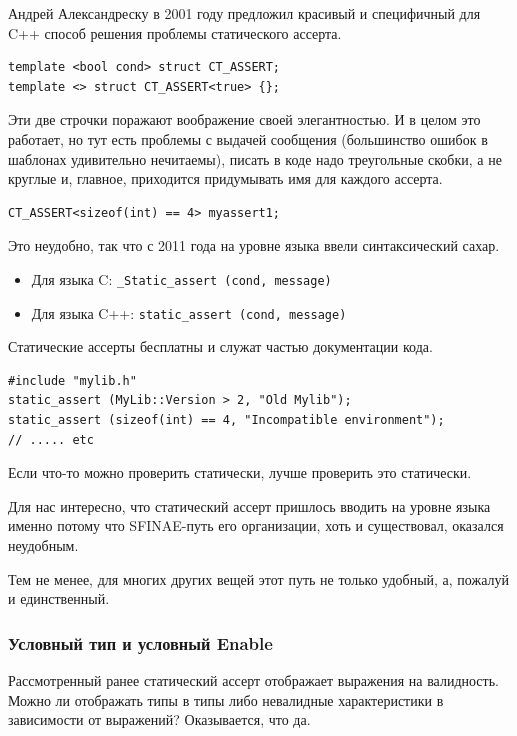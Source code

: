 \documentclass[a4paper,12pt,oneside]{article}
\begin{document}
Андрей Александреску \cite{mcpp} в 2001 году предложил красивый и специфичный для C++ способ решения проблемы статического ассерта.

\begin{lstlisting}
template <bool cond> struct CT_ASSERT;
template <> struct CT_ASSERT<true> {};
\end{lstlisting}

Эти две строчки поражают воображение своей элегантностью. И в целом это работает, но тут есть проблемы с выдачей сообщения (большинство ошибок в шаблонах удивительно нечитаемы), писать в коде надо треугольные скобки, а не круглые и, главное, приходится придумывать имя для каждого ассерта.

\begin{lstlisting}
CT_ASSERT<sizeof(int) == 4> myassert1; 
\end{lstlisting}

Это неудобно, так что с 2011 года на уровне языка ввели синтаксический сахар.

\begin{itemize}
\item Для языка C: \lstinline!_Static_assert (cond, message)!
\item Для языка C++: \lstinline!static_assert (cond, message)!
\end{itemize}

Статические ассерты бесплатны и служат частью документации кода.

\begin{lstlisting}
#include "mylib.h"
static_assert (MyLib::Version > 2, "Old Mylib");
static_assert (sizeof(int) == 4, "Incompatible environment");
// ..... etc
\end{lstlisting}

Если что-то можно проверить статически, лучше проверить это статически.

Для нас интересно, что статический ассерт пришлось вводить на уровне языка именно потому что SFINAE-путь его организации, хоть и существовал, оказался неудобным.

Тем не менее, для многих других вещей этот путь не только удобный, а, пожалуй и единственный.

\subsubsection{Условный тип и условный Enable}

Рассмотренный ранее статический ассерт отображает выражения на валидность. Можно ли отображать типы в типы либо невалидные характеристики в зависимости от выражений? Оказывается, что да.
\end{document}
